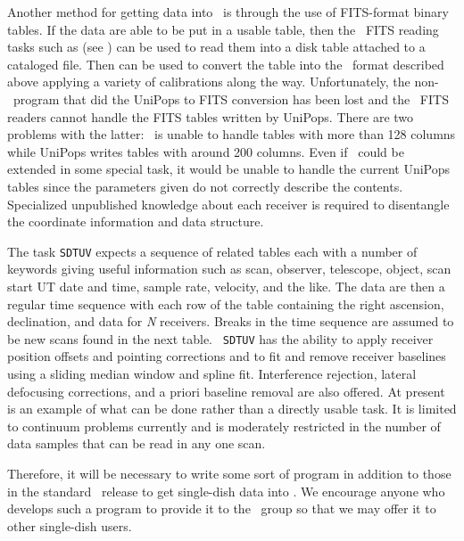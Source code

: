 
     Another method for getting  data into \AIPS\ is
through the use of FITS-format binary tables.  If the data are able to
be put in a usable table, then the \AIPS\ FITS reading tasks such as
{\tt {}} (see ) can be used to read them into a
disk table attached to a cataloged file.  Then {\tt {}} can
be used to convert the table into the \uv\ format described above
applying a variety of calibrations along the way.  Unfortunately, the
non-\AIPS\ program that did the UniPops to FITS conversion has been
lost and the \AIPS\ FITS readers cannot handle the FITS tables written
by UniPops.  There are two problems with the latter: \AIPS\ is unable
to handle tables with more than 128 columns while UniPops writes
tables with around 200 columns.  Even if \AIPS\ could be extended in
some special task, it would be unable to handle the current UniPops
tables since the parameters given do not correctly describe the
contents.  Specialized unpublished knowledge about each receiver is
required to disentangle the coordinate information and data structure.

     The task {\tt SDTUV} expects a sequence of related tables each
with a number of keywords giving useful information such as scan,
observer, telescope, object, scan start UT date and time, sample rate,
velocity, and the like.  The data are then a regular time sequence
with each row of the table containing the right ascension,
declination, and data for {\it N\/} receivers.  Breaks in the time
sequence are assumed to be new scans found in the next table.  {\tt
SDTUV} has the ability to apply receiver position offsets and pointing
corrections and to fit and remove receiver baselines using a sliding
median window and spline fit.  Interference rejection, lateral
defocusing corrections, and a priori baseline removal are also
offered.  At present {\tt {}} is an example of what can be
done rather than a directly usable task.  It is limited to continuum
problems currently and is moderately restricted in the number of data
samples that can be read in any one scan.

     Therefore, it will be necessary to write some sort of program in
addition to those in the standard \AIPS\ release to get single-dish
data into \hbox{\AIPS}.  We encourage anyone who develops such a
program to provide it to the \AIPS\ group so that we may offer it to
other single-dish users.


